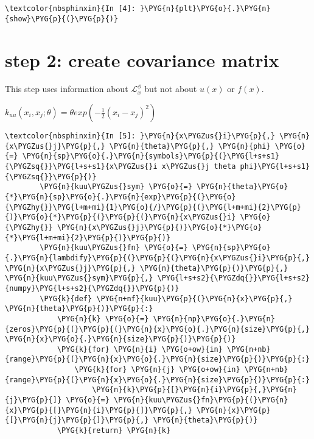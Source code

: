 \documentclass[letterpaper,10pt,english]{sphinxmanual}
\begin{document}
%
\begin{Verbatim}[commandchars=\\\{\}]
\textcolor{nbsphinxin}{In [4]: }\PYG{n}{plt}\PYG{o}{.}\PYG{n}{show}\PYG{p}{(}\PYG{p}{)}
\end{Verbatim}

\noindent{}


\section{step 2: create covariance matrix}
\label{\detokenize{report/4-par_est:step-2:-create-covariance-matrix}}
This step uses information about \(\mathcal{L}_x^\phi\) but not
about \(u(x)\) or \(f(x)\).

\(k_{uu}(x_i, x_j; \theta) = \theta exp(-\frac{1}{2}(x_i-x_j)^2)\)

%
\begin{Verbatim}[commandchars=\\\{\}]
\textcolor{nbsphinxin}{In [5]: }\PYG{n}{x\PYGZus{}i}\PYG{p}{,} \PYG{n}{x\PYGZus{}j}\PYG{p}{,} \PYG{n}{theta}\PYG{p}{,} \PYG{n}{phi} \PYG{o}{=} \PYG{n}{sp}\PYG{o}{.}\PYG{n}{symbols}\PYG{p}{(}\PYG{l+s+s1}{\PYGZsq{}}\PYG{l+s+s1}{x\PYGZus{}i x\PYGZus{}j theta phi}\PYG{l+s+s1}{\PYGZsq{}}\PYG{p}{)}
        \PYG{n}{kuu\PYGZus{}sym} \PYG{o}{=} \PYG{n}{theta}\PYG{o}{*}\PYG{n}{sp}\PYG{o}{.}\PYG{n}{exp}\PYG{p}{(}\PYG{o}{\PYGZhy{}}\PYG{l+m+mi}{1}\PYG{o}{/}\PYG{p}{(}\PYG{l+m+mi}{2}\PYG{p}{)}\PYG{o}{*}\PYG{p}{(}\PYG{p}{(}\PYG{n}{x\PYGZus{}i} \PYG{o}{\PYGZhy{}} \PYG{n}{x\PYGZus{}j}\PYG{p}{)}\PYG{o}{*}\PYG{o}{*}\PYG{l+m+mi}{2}\PYG{p}{)}\PYG{p}{)}
        \PYG{n}{kuu\PYGZus{}fn} \PYG{o}{=} \PYG{n}{sp}\PYG{o}{.}\PYG{n}{lambdify}\PYG{p}{(}\PYG{p}{(}\PYG{n}{x\PYGZus{}i}\PYG{p}{,} \PYG{n}{x\PYGZus{}j}\PYG{p}{,} \PYG{n}{theta}\PYG{p}{)}\PYG{p}{,} \PYG{n}{kuu\PYGZus{}sym}\PYG{p}{,} \PYG{l+s+s2}{\PYGZdq{}}\PYG{l+s+s2}{numpy}\PYG{l+s+s2}{\PYGZdq{}}\PYG{p}{)}
        \PYG{k}{def} \PYG{n+nf}{kuu}\PYG{p}{(}\PYG{n}{x}\PYG{p}{,} \PYG{n}{theta}\PYG{p}{)}\PYG{p}{:}
            \PYG{n}{k} \PYG{o}{=} \PYG{n}{np}\PYG{o}{.}\PYG{n}{zeros}\PYG{p}{(}\PYG{p}{(}\PYG{n}{x}\PYG{o}{.}\PYG{n}{size}\PYG{p}{,} \PYG{n}{x}\PYG{o}{.}\PYG{n}{size}\PYG{p}{)}\PYG{p}{)}
            \PYG{k}{for} \PYG{n}{i} \PYG{o+ow}{in} \PYG{n+nb}{range}\PYG{p}{(}\PYG{n}{x}\PYG{o}{.}\PYG{n}{size}\PYG{p}{)}\PYG{p}{:}
                \PYG{k}{for} \PYG{n}{j} \PYG{o+ow}{in} \PYG{n+nb}{range}\PYG{p}{(}\PYG{n}{x}\PYG{o}{.}\PYG{n}{size}\PYG{p}{)}\PYG{p}{:}
                    \PYG{n}{k}\PYG{p}{[}\PYG{n}{i}\PYG{p}{,}\PYG{n}{j}\PYG{p}{]} \PYG{o}{=} \PYG{n}{kuu\PYGZus{}fn}\PYG{p}{(}\PYG{n}{x}\PYG{p}{[}\PYG{n}{i}\PYG{p}{]}\PYG{p}{,} \PYG{n}{x}\PYG{p}{[}\PYG{n}{j}\PYG{p}{]}\PYG{p}{,} \PYG{n}{theta}\PYG{p}{)}
            \PYG{k}{return} \PYG{n}{k}
\end{Verbatim}
\end{document}
